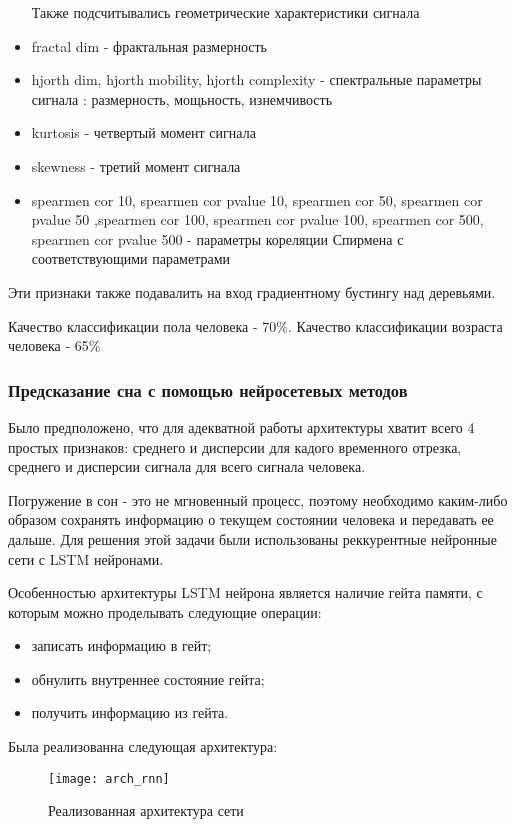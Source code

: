 \begin{itemize}
	Также подсчитывались геометрические характеристики сигнала
	
	\item fractal dim - фрактальная размерность
	\item hjorth dim, hjorth mobility, hjorth complexity - спектральные параметры сигнала : размерность, мощьность, изнемчивость
	\item kurtosis - четвертый момент сигнала
	\item skewness - третий момент сигнала
	\item spearmen cor 10, spearmen cor pvalue 10, spearmen cor 50, spearmen cor pvalue 50	
	,spearmen cor 100, spearmen cor pvalue 100, spearmen cor 500, spearmen cor pvalue 500 - 
	параметры кореляции Спирмена с соответствующими параметрами
\end{itemize}
Эти признаки также подавалить на вход градиентному бустингу над деревьями. 

Качество классификации пола человека - 70\%.
Качество классификации возраста человека - 65\%
\subsubsection{Предсказание сна с помощью нейросетевых методов}


Было предположено, что для адекватной работы архитектуры хватит всего 4 простых признаков: среднего и дисперсии для кадого временного отрезка, среднего и дисперсии сигнала для всего сигнала человека.

Погружение в сон - это не мгновенный процесс, поэтому необходимо каким-либо образом сохранять информацию о текущем состоянии человека и передавать ее дальше. Для решения этой задачи были использованы реккурентные нейронные сети с LSTM \cite{create_lstm} нейронами. 

Особенностью архитектуры LSTM нейрона является наличие гейта памяти, с которым можно проделывать следующие операции:
\begin{itemize}
	\item записать информацию в гейт;
	\item обнулить внутреннее состояние гейта;
	\item получить информацию из гейта.
\end{itemize}

Была реализованна следующая архитектура:

\begin{figure}[h]
	\begin{center}
		\texttt{[image: arch\_rnn]}
		\caption{Реализованная архитектура сети}
		\label{ris:arh}
	\end{center}
\end{figure}

